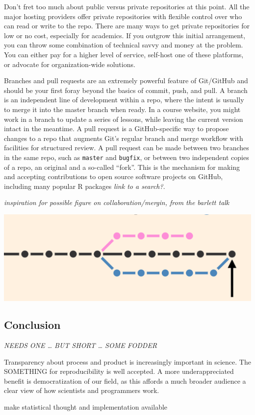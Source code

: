 \documentclass[12pt]{article}
\begin{document}
Don't fret too much about public versus private repositories at this
point. All the major hosting providers offer private repositories with
flexible control over who can read or write to the repo. There are many
ways to get private repositories for low or no cost, especially for
academics. If you outgrow this initial arrangement, you can throw some
combination of technical savvy and money at the problem. You can either
pay for a higher level of service, self-host one of these platforms, or
advocate for organization-wide solutions.

Branches and pull requests are an extremely powerful feature of
Git/GitHub and should be your first foray beyond the basics of commit,
push, and pull. A branch is an independent line of development within a
repo, where the intent is usually to merge it into the master branch
when ready. In a course website, you might work in a branch to update a
series of lessons, while leaving the current version intact in the
meantime. A pull request is a GitHub-specific way to propose changes to
a repo that augments Git's regular branch and merge workflow with
facilities for structured review. A pull request can be made between two
branches in the same repo, such as \texttt{master} and \texttt{bugfix},
or between two independent copies of a repo, an original and a so-called
``fork''. This is the mechanism for making and accepting contributions
to open source software projects on GitHub, including many popular R
packages \emph{link to a search?}.

\emph{inspiration for possible figure on collaboration/mergin, from the
barlett talk}

\includegraphics[width=1\linewidth]{bartlett-merge-commit}

\subsection{Conclusion}\label{conclusion}

\emph{NEEDS ONE \ldots{} BUT SHORT \ldots{} SOME FODDER}

Transparency about process and product is increasingly important in
science. The SOMETHING for reproducibility is well accepted. A more
underappreciated benefit is democratization of our field, as this
affords a much broader audience a clear view of how scientists and
programmers work.

make statistical thought and implementation available



\end{document}
